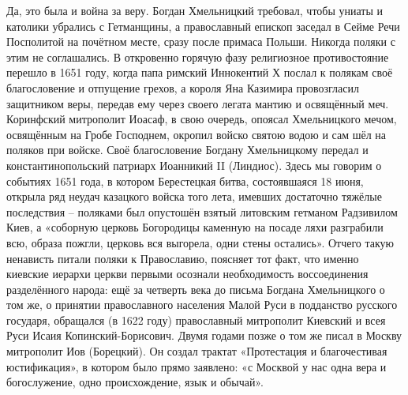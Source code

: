 Да, это была и война за веру. Богдан Хмельницкий требовал, чтобы униаты и
католики убрались с Гетманщины, а православный епископ заседал в Сейме Речи
Посполитой на почётном месте, сразу после примаса Польши. Никогда поляки с этим
не соглашались. В откровенно горячую фазу религиозное противостояние перешло в
1651 году, когда папа римский Иннокентий Х послал к полякам своё благословение
и отпущение грехов, а короля Яна Казимира провозгласил защитником веры, передав
ему через своего легата мантию и освящённый меч. Коринфский митрополит Иоасаф,
в свою очередь, опоясал Хмельницкого мечом, освящённым на Гробе Господнем,
окропил войско святою водою и сам шёл на поляков при войске. Своё благословение
Богдану Хмельницкому передал и константинопольский патриарх Иоанникий II
(Линдиос).  Здесь мы говорим о событиях 1651 года, в котором Берестецкая битва,
состоявшаяся 18 июня, открыла ряд неудач казацкого войска того лета, имевших
достаточно тяжёлые последствия – поляками был опустошён взятый литовским
гетманом Радзивилом Киев, а «соборную церковь Богородицы каменную на посаде
ляхи разграбили всю, образа пожгли, церковь вся выгорела, одни стены остались».
Отчего такую ненависть питали поляки к Православию, поясняет тот факт, что
именно киевские иерархи церкви первыми осознали необходимость воссоединения
разделённого народа: ещё за четверть века до письма Богдана Хмельницкого о том
же, о принятии православного населения Малой Руси в подданство русского
государя, обращался (в 1622 году) православный митрополит Киевский и всея Руси
Исаия Копинский-Борисович. Двумя годами позже о том же писал в Москву
митрополит Иов (Борецкий). Он создал трактат «Протестация и благочестивая
юстификация», в котором было прямо заявлено: «с Москвой у нас одна вера и
богослужение, одно происхождение, язык и обычай».

